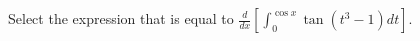 \documentclass{ximera}
\author{Nela Lakos \and Kyle Parsons}
\begin{document}
\begin{exercise}

Select the expression that is equal to $\frac{d}{dx}\left[\int_0^{\cos x} \tan\left(t^3-1\right) dt\right]$.
\begin{multipleChoice}
\end{multipleChoice}

\end{exercise}
\end{document}
